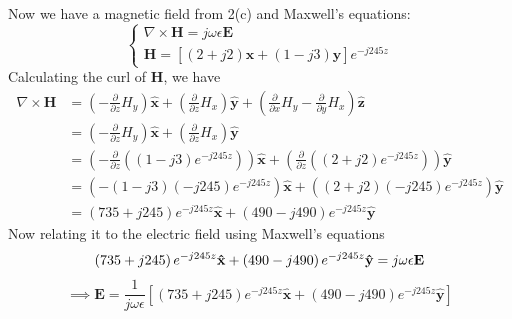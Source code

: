 \documentclass[11pt]{article}
\begin{document}
\begin{homeworkProblem}
Now we have a magnetic field from 2(c) and Maxwell's equations:
\[\begin{cases}
    \nabla \times \mathbf{H} = j \omega \epsilon \mathbf{E} \\
    \mathbf{H} = [(2 + j2) \hat{\mathbf{x}} + (1 - j 3) \hat{\mathbf{y}}] e^{-j 245 z}
\end{cases}\]
Calculating the curl of $\mathbf{H}$, we have
\begingroup
\addtolength{\jot}{1em}
\begin{align*}
    \nabla\times\mathbf{H} &= \left(-\frac{\partial}{\partial z} H_y\right) \mathbf{\hat{x}} + \left(\frac{\partial}{\partial z} H_x\right) \mathbf{\hat{y}} + \left(\frac{\partial}{\partial x} H_y - \frac{\partial}{\partial y} H_x\right) \mathbf{\hat{z}} \\
    &= \left(-\frac{\partial}{\partial z} H_y\right) \mathbf{\hat{x}} + \left(\frac{\partial}{\partial z} H_x\right) \mathbf{\hat{y}} \\
    &= \left(-\frac{\partial}{\partial z} \left((1 - j 3) e^{-j 245 z}\right)\right) \mathbf{\hat{x}} + \left(\frac{\partial}{\partial z} \left((2 + j2) e^{-j 245 z}\right)\right) \mathbf{\hat{y}} \\
    &= \left(- (1 - j 3)(-j 245) e^{-j 245 z}\right) \mathbf{\hat{x}} + \left((2 + j2)(-j 245) e^{-j 245 z}\right) \mathbf{\hat{y}} \\
    &= \left(735 + j245\right) e^{-j 245 z} \mathbf{\hat{x}} + \left(490 - j 490\right) e^{-j 245 z} \mathbf{\hat{y}}
\end{align*}
\endgroup
Now relating it to the electric field using Maxwell's equations
\[
    \left(735 + j245\right) e^{-j 245 z} \mathbf{\hat{x}} + \left(490 - j 490\right) e^{-j 245 z} \mathbf{\hat{y}} = j \omega \epsilon \mathbf{E} \\
\]
\[
    \implies \mathbf{E} = \frac{1}{j \omega \epsilon} \left[ \left(735 + j245\right) e^{-j 245 z} \mathbf{\hat{x}} + \left(490 - j 490\right) e^{-j 245 z} \mathbf{\hat{y}} \right]
\]
\end{homeworkProblem}

\pagebreak
\end{document}
